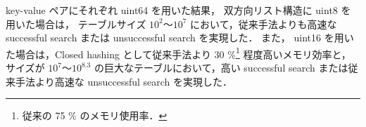 key-value ペアにそれぞれ uint64 を用いた結果，
双方向リスト構造に uint8 を用いた場合は，
テーブルサイズ $10^2〜10^{7}$ において，従来手法よりも高速な successful search または unsuccessful search を実現した．
また，
uint16 を用いた場合は，Closed hashing として従来手法より 30 \%\footnote{従来の 75 \% のメモリ使用率．} 程度高いメモリ効率と，
サイズが $10^7〜10^{8.3}$ の巨大なテーブルにおいて，高い successful search または従来手法より高速な unsuccessful search を実現した．







